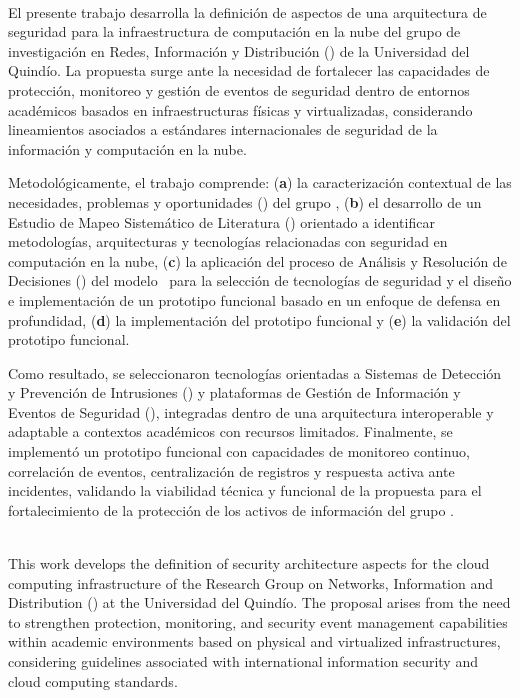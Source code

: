 \label{cap:resumen}
\mbox{}\\
\noindent
El presente trabajo desarrolla la definición de aspectos de una arquitectura de seguridad para la infraestructura de computación en la nube 
del grupo de investigación en Redes, Información y Distribución (\GRID) de la Universidad del Quindío. La propuesta surge ante la necesidad 
de fortalecer las capacidades de protección, monitoreo y gestión de eventos de seguridad dentro de entornos académicos basados en 
infraestructuras físicas y virtualizadas, considerando lineamientos asociados a estándares internacionales de seguridad de la información y 
computación en la nube.

Metodológicamente, el trabajo comprende: (\textbf{a}) la caracterización contextual de las necesidades, problemas y oportunidades (\NPO) 
del grupo \GRID, (\textbf{b}) el desarrollo de un Estudio de Mapeo Sistemático de Literatura (\SMS) orientado a identificar metodologías, 
arquitecturas y tecnologías relacionadas con seguridad en computación en la nube, (\textbf{c}) la aplicación del proceso de Análisis y 
Resolución de Decisiones (\DAR) del modelo \CMMI~para la selección de tecnologías de seguridad y el diseño e implementación 
de un prototipo funcional basado en un enfoque de defensa en profundidad, (\textbf{d}) la implementación del prototipo funcional y 
(\textbf{e}) la validación del prototipo funcional.

Como resultado, se seleccionaron tecnologías orientadas a Sistemas de Detección y Prevención de Intrusiones (\IDPS) y plataformas de 
Gestión de Información y Eventos de Seguridad (\SIEM), integradas dentro de una arquitectura interoperable y adaptable a contextos 
académicos con recursos limitados. Finalmente, se implementó un prototipo funcional con capacidades de monitoreo continuo, correlación de 
eventos, centralización de registros y respuesta activa ante incidentes, validando la viabilidad técnica y funcional de la propuesta para 
el fortalecimiento de la protección de los activos de información del grupo \GRID.


\label{cap:abstract}
\mbox{}\\
\noindent
This work develops the definition of security architecture aspects for the cloud computing infrastructure of the Research Group on Networks, 
Information and Distribution (\GRID) at the Universidad del Quindío. The proposal arises from the need to strengthen protection, monitoring, 
and security event management capabilities within academic environments based on physical and virtualized infrastructures, considering 
guidelines associated with international information security and cloud computing standards.

